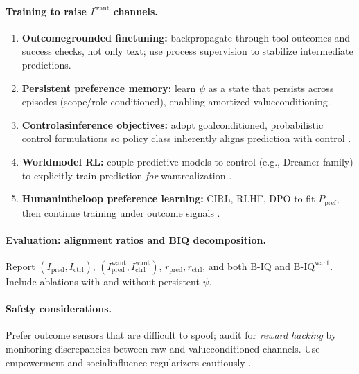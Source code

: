 \documentclass[11pt]{article}
\begin{document}
\paragraph{Training to raise $I^{\text{want}}$ channels.}
\begin{enumerate}[leftmargin=2em]
  \item \textbf{Outcome\textendash grounded fine\textendash tuning:} backpropagate through tool outcomes and success checks, not only text; use process supervision to stabilize intermediate predictions.
  \item \textbf{Persistent preference memory:} learn $\psi$ as a state that persists across episodes (scope/role conditioned), enabling amortized value\textendash conditioning.
  \item \textbf{Control\textendash as\textendash inference objectives:} adopt goal\textendash conditioned, probabilistic control formulations so policy class inherently aligns prediction with control \citep{Levine2018}.
  \item \textbf{World\textendash model RL:} couple predictive models to control (e.g., Dreamer family) to explicitly train prediction \emph{for} want\textendash realization \citep{Hafner2019, Hafner2023}.
  \item \textbf{Human\textendash in\textendash the\textendash loop preference learning:} CIRL, RLHF, DPO to fit $P_{\mathrm{pref}}$, then continue training under outcome signals \citep{HadfieldMenell2016, Christiano2017, Rafailov2023}.
\end{enumerate}

\paragraph{Evaluation: alignment ratios and B\textendash IQ decomposition.} Report $(I_{\mathrm{pred}}, I_{\mathrm{ctrl}})$, $(I^{\text{want}}_{\mathrm{pred}}, I^{\text{want}}_{\mathrm{ctrl}})$, $r_{\mathrm{pred}}, r_{\mathrm{ctrl}}$, and both $\mathrm{B\text{-}IQ}$ and $\mathrm{B\text{-}IQ}^{\text{want}}$. Include ablations with and without persistent $\psi$.

\paragraph{Safety considerations.} Prefer outcome sensors that are difficult to spoof; audit for \emph{reward hacking} by monitoring discrepancies between raw and value\textendash conditioned channels. Use empowerment and social\textendash influence regularizers cautiously \citep{Klyubin2005, SalgePolani2014, Jaques2019}.
\end{document}
